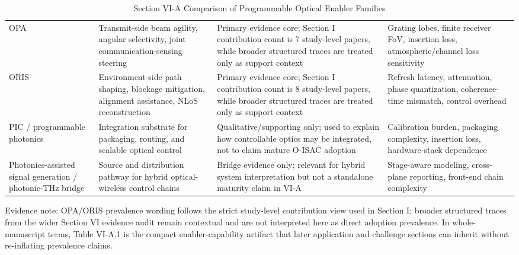 \begin{table}[htbp]
\caption{Section VI-A Comparison of Programmable Optical Enabler Families}
\label{tab:vi_a_enablers}
\centering
\setlength{\tabcolsep}{4pt}
\renewcommand{\arraystretch}{1.12}
\begin{tabularx}{\textwidth}{@{}L{2.4cm}Y Y Y@{}}
\toprule
{} &  &  &  \\
\midrule
OPA & Transmit-side beam agility, angular selectivity, joint communication-sensing steering & Primary evidence core; Section I contribution count is 7 study-level papers, while broader structured traces are treated only as support context & Grating lobes, finite receiver FoV, insertion loss, atmospheric/channel loss sensitivity \\
ORIS & Environment-side path shaping, blockage mitigation, alignment assistance, NLoS reconstruction & Primary evidence core; Section I contribution count is 8 study-level papers, while broader structured traces are treated only as support context & Refresh latency, attenuation, phase quantization, coherence-time mismatch, control overhead \\
PIC / programmable photonics & Integration substrate for packaging, routing, and scalable optical control & Qualitative/supporting only; used to explain how controllable optics may be integrated, not to claim mature O-ISAC adoption & Calibration burden, packaging complexity, insertion loss, hardware-stack dependence \\
Photonics-assisted signal generation / photonic-THz bridge & Source and distribution pathway for hybrid optical-wireless control chains & Bridge evidence only; relevant for hybrid system interpretation but not a standalone maturity claim in VI-A & Stage-aware modeling, cross-plane reporting, front-end chain complexity \\
\bottomrule
\end{tabularx}
\end{table}

Evidence note: OPA/ORIS prevalence wording follows the strict study-level contribution view used in Section I; broader structured traces from the wider Section VI evidence audit remain contextual and are not interpreted here as direct adoption prevalence. In whole-manuscript terms, Table VI-A.1 is the compact enabler-capability artifact that later application and challenge sections can inherit without re-inflating prevalence claims.

